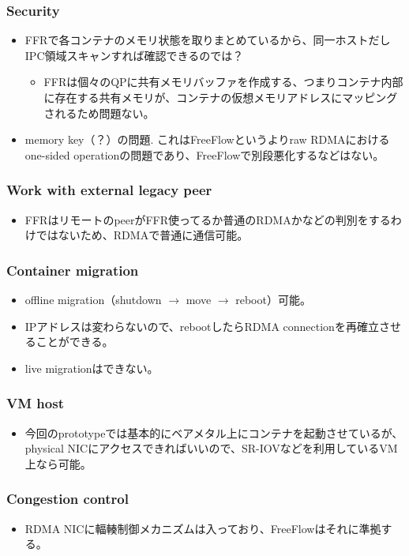 \documentclass[dvipdfmx,9pt,notheorems]{beamer}
\theoremstyle{definition}
\begin{document}
\begin{frame}\frametitle{Security}
	\begin{itemize}
		\item FFRで各コンテナのメモリ状態を取りまとめているから、同一ホストだしIPC領域スキャンすれば確認できるのでは？
		\begin{itemize}
			\item FFRは個々のQPに共有メモリバッファを作成する、つまりコンテナ内部に存在する共有メモリが、コンテナの仮想メモリアドレスにマッピングされるため問題ない。
		\end{itemize}
		\item memory key（？）の問題. これはFreeFlowというよりraw RDMAにおけるone-sided operationの問題であり、FreeFlowで別段悪化するなどはない。
	\end{itemize}
\end{frame}

\begin{frame}\frametitle{Work with external legacy peer}
	\begin{itemize}
		\item FFRはリモートのpeerがFFR使ってるか普通のRDMAかなどの判別をするわけではないため、RDMAで普通に通信可能。
	\end{itemize}
\end{frame}

\begin{frame}\frametitle{Container migration}
	\begin{itemize}
		\item offline migration（shutdown $\rightarrow$ move $\rightarrow$ reboot）可能。
		\item IPアドレスは変わらないので、rebootしたらRDMA connectionを再確立させることができる。
		\item live migrationはできない。
	\end{itemize}
\end{frame}

\begin{frame}\frametitle{VM host}
	\begin{itemize}
		\item 今回のprototypeでは基本的にベアメタル上にコンテナを起動させているが、physical NICにアクセスできればいいので、SR-IOVなどを利用しているVM上なら可能。
	\end{itemize}
\end{frame}

\begin{frame}\frametitle{Congestion control}
	\begin{itemize}
		\item RDMA NICに輻輳制御メカニズムは入っており、FreeFlowはそれに準拠する。
	\end{itemize}
\end{frame}
\end{document}
